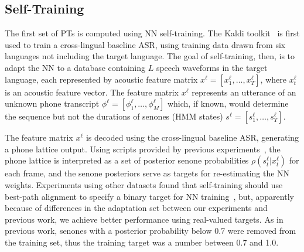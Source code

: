 \subsection{Self-Training}
\label{sec:selftraining}

The first set of PTs is computed using NN self-training.
The Kaldi toolkit~\cite{Kaldi2011} is first used to train a
cross-lingual baseline ASR, using training data drawn from six
languages not including the target language.  The goal of
self-training, then, is to adapt the NN to a database containing
$L$ speech waveforms in the target language, each represented by
acoustic feature matrix $x^\ell =[x_1^\ell,\ldots,x_T^\ell]$, where
$x_t^\ell$ is an acoustic feature vector.  The feature matrix $x^\ell$
represents an utterance of an unknown phone transcript
$\phi^\ell=[\phi_1^\ell,\ldots,\phi_M^\ell]$ which, if known, would
determine the sequence but not the durations of senones (HMM states)
$s^\ell =[s_1^\ell,\ldots,s_T^\ell]$.

The feature matrix $x^\ell$ is decoded using the cross-lingual
baseline ASR, generating a phone lattice output.  Using scripts
provided by previous experiments~\cite{vesely2013-semi}, the phone
lattice is interpreted as a set of posterior senone probabilities
$\rho(s_t^\ell|x_t^\ell)$ for each frame, and the senone posteriors
serve as targets for re-estimating the NN weights.
Experiments using other datasets found that self-training
should use best-path alignment to specify a binary target for NN
training~\cite{vesely2013-semi}, but, apparently because of
differences in the adaptation set between our experiments and previous
work, we achieve better performance using real-valued targets.
{\color{blue} As in previous work, senones with a posterior probability
  below 0.7 were removed from the training set, thus the training target
  was a number between 0.7 and 1.0.}

